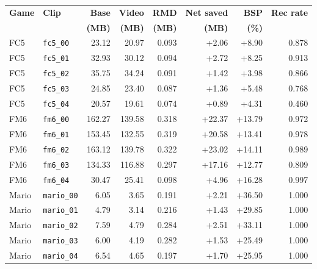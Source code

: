 \begin{tabular}{@{}llrrrrrr@{}}
\toprule
\textbf{Game} & \textbf{Clip} & \textbf{Base} & \textbf{Video} & \textbf{RMD} & \textbf{Net saved} & \textbf{BSP} & \textbf{Rec rate} \\
 & & \textbf{(MB)} & \textbf{(MB)} & \textbf{(MB)} & \textbf{(MB)} & \textbf{(\%)} & \\
\midrule
FC5 & \texttt{fc5\_00} & 23.12 & 20.97 & 0.093 & +2.06 & +8.90 & 0.878 \\
FC5 & \texttt{fc5\_01} & 32.93 & 30.12 & 0.094 & +2.72 & +8.25 & 0.913 \\
FC5 & \texttt{fc5\_02} & 35.75 & 34.24 & 0.091 & +1.42 & +3.98 & 0.866 \\
FC5 & \texttt{fc5\_03} & 24.85 & 23.40 & 0.087 & +1.36 & +5.48 & 0.768 \\
FC5 & \texttt{fc5\_04} & 20.57 & 19.61 & 0.074 & +0.89 & +4.31 & 0.460 \\
\midrule
FM6 & \texttt{fm6\_00} & 162.27 & 139.58 & 0.318 & +22.37 & +13.79 & 0.972 \\
FM6 & \texttt{fm6\_01} & 153.45 & 132.55 & 0.319 & +20.58 & +13.41 & 0.978 \\
FM6 & \texttt{fm6\_02} & 163.12 & 139.78 & 0.322 & +23.02 & +14.11 & 0.989 \\
FM6 & \texttt{fm6\_03} & 134.33 & 116.88 & 0.297 & +17.16 & +12.77 & 0.809 \\
FM6 & \texttt{fm6\_04} & 30.47 & 25.41 & 0.098 & +4.96 & +16.28 & 0.997 \\
\midrule
Mario & \texttt{mario\_00} & 6.05 & 3.65 & 0.191 & +2.21 & +36.50 & 1.000 \\
Mario & \texttt{mario\_01} & 4.79 & 3.14 & 0.216 & +1.43 & +29.85 & 1.000 \\
Mario & \texttt{mario\_02} & 7.59 & 4.79 & 0.284 & +2.51 & +33.11 & 1.000 \\
Mario & \texttt{mario\_03} & 6.00 & 4.19 & 0.282 & +1.53 & +25.49 & 1.000 \\
Mario & \texttt{mario\_04} & 6.54 & 4.65 & 0.197 & +1.70 & +25.95 & 1.000 \\
\bottomrule
\end{tabular}
